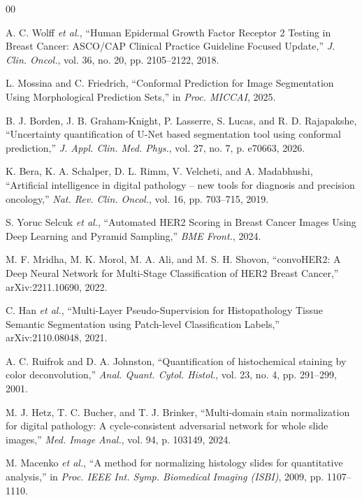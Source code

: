 \documentclass[conference]{IEEEtran}
\begin{document}
\begin{thebibliography}{00}

 A. C. Wolff \emph{et al.}, ``Human Epidermal Growth
Factor Receptor 2 Testing in Breast Cancer: ASCO/CAP Clinical Practice
Guideline Focused Update,'' \emph{J. Clin. Oncol.}, vol. 36, no. 20,
pp. 2105--2122, 2018.

 L. Mossina and C. Friedrich, ``Conformal Prediction
for Image Segmentation Using Morphological Prediction Sets,'' in
\emph{Proc. MICCAI}, 2025.

 B. J. Borden, J. B. Graham-Knight, P. Lasserre,
S. Lucas, and R. D. Rajapakshe, ``Uncertainty quantification of U-Net based
segmentation tool using conformal prediction,'' \emph{J. Appl. Clin. Med.
Phys.}, vol. 27, no. 7, p. e70663, 2026.

 K. Bera, K. A. Schalper, D. L. Rimm, V. Velcheti, and
A. Madabhushi, ``Artificial intelligence in digital pathology -- new tools
for diagnosis and precision oncology,'' \emph{Nat. Rev. Clin. Oncol.},
vol. 16, pp. 703--715, 2019.

 S. Yoruc Selcuk \emph{et al.}, ``Automated HER2
Scoring in Breast Cancer Images Using Deep Learning and Pyramid Sampling,''
\emph{BME Front.}, 2024.

 M. F. Mridha, M. K. Morol, M. A. Ali, and M. S. H.
Shovon, ``convoHER2: A Deep Neural Network for Multi-Stage Classification
of HER2 Breast Cancer,'' arXiv:2211.10690, 2022.

 C. Han \emph{et al.}, ``Multi-Layer Pseudo-Supervision
for Histopathology Tissue Semantic Segmentation using Patch-level
Classification Labels,'' arXiv:2110.08048, 2021.

 A. C. Ruifrok and D. A. Johnston, ``Quantification of
histochemical staining by color deconvolution,'' \emph{Anal. Quant. Cytol.
Histol.}, vol. 23, no. 4, pp. 291--299, 2001.

 M. J. Hetz, T. C. Bucher, and T. J. Brinker,
``Multi-domain stain normalization for digital pathology: A
cycle-consistent adversarial network for whole slide images,'' \emph{Med.
Image Anal.}, vol. 94, p. 103149, 2024.

 M. Macenko \emph{et al.}, ``A method for normalizing
histology slides for quantitative analysis,'' in \emph{Proc. IEEE Int.
Symp. Biomedical Imaging (ISBI)}, 2009, pp. 1107--1110.


\end{thebibliography}
\end{document}
